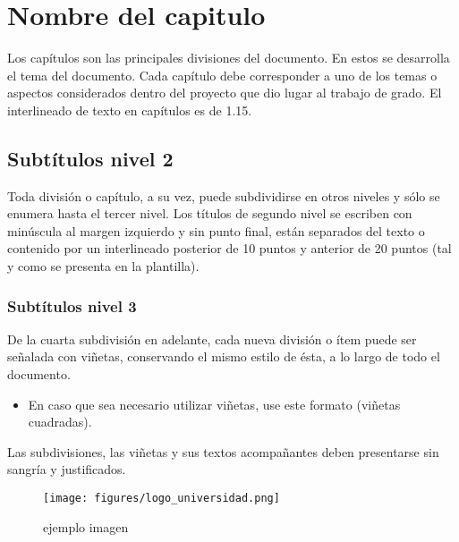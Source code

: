 \chapter{Nombre del capitulo}

Los capítulos son las principales divisiones del documento. En estos se desarrolla el tema del documento. Cada capítulo debe corresponder a uno de los temas o aspectos considerados dentro del proyecto que dio lugar al trabajo de grado.  El interlineado de texto en capítulos es de 1.15.

\section{Subtítulos nivel 2}
Toda división o capítulo, a su vez, puede subdividirse en otros niveles y sólo se enumera hasta el tercer nivel. Los títulos de segundo nivel se escriben con minúscula al margen izquierdo y sin punto final, están separados del texto o contenido por un interlineado posterior de 10 puntos y anterior de 20 puntos (tal y como se presenta en la plantilla).

\subsection{Subtítulos nivel 3}

De la cuarta subdivisión en adelante, cada nueva división o ítem puede ser señalada con viñetas, conservando el mismo estilo de ésta, a lo largo de todo el documento.\\

\begin{itemize}
\item En caso que sea necesario utilizar viñetas, use este formato (viñetas cuadradas).
\end{itemize}

Las subdivisiones, las viñetas y sus textos acompañantes deben presentarse sin sangría y justificados. 

\begin{figure}[h]
\centering
\texttt{[image: figures/logo\_universidad.png]}
\caption{ejemplo imagen}
\end{figure}


 

